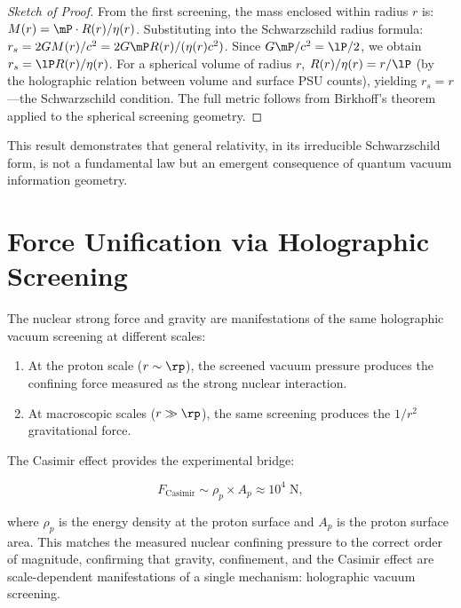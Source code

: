 \documentclass[12pt, a4paper]{article}
\theoremstyle{plain}
\theoremstyle{definition}
\begin{document}
\begin{proof}[Sketch of Proof]
  From the first screening, the mass enclosed within radius $r$ is:
  $M(r) = \mP \cdot R(r) / \eta(r)$. Substituting into the Schwarzschild
  radius formula: $r_s = 2GM(r)/c^2 = 2G\mP R(r) / (\eta(r) c^2)$.
  Since $G\mP/c^2 = \lP/2$, we obtain $r_s = \lP R(r)/\eta(r)$.
  For a spherical volume of radius $r$, $R(r)/\eta(r) = r/\lP$ (by the
  holographic relation between volume and surface PSU counts), yielding
  $r_s = r$---the Schwarzschild condition. The full metric follows from
  Birkhoff's theorem applied to the spherical screening geometry. \qedhere
\end{proof}

This result demonstrates that general relativity, in its irreducible
Schwarzschild form, is not a fundamental law but an emergent consequence
of quantum vacuum information geometry.

\section{Force Unification via Holographic Screening}\label{sec:unification}

\begin{proposition}\label{prop:unification}
  The nuclear strong force and gravity are manifestations of the same
  holographic vacuum screening at different scales:
  \begin{enumerate}[label=(\roman*)]
    \item At the proton scale ($r \sim \rp$), the screened vacuum pressure
      produces the confining force measured as the strong nuclear interaction.
    \item At macroscopic scales ($r \gg \rp$), the same screening produces
      the $1/r^2$ gravitational force.
  \end{enumerate}
\end{proposition}

The Casimir effect provides the experimental bridge:

\begin{equation}\label{eq:casimir}
  F_{\text{Casimir}} \sim \rho_p \times A_p \approx 10^4 \; \text{N},
\end{equation}

where $\rho_p$ is the energy density at the proton surface and $A_p$ is
the proton surface area. This matches the measured nuclear confining
pressure to the correct order of magnitude, confirming that gravity,
confinement, and the Casimir effect are scale-dependent manifestations of
a single mechanism: holographic vacuum screening.
\end{document}
